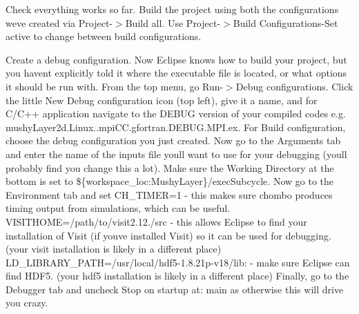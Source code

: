 \begin{DoxyEnumerate}
\item Check everything works so far. Build the project using both the configurations we\textquotesingle{}ve created via Project-\/$>$Build all. Use Project-\/$>$Build Configurations-\/\+Set active to change between build configurations.
\item Create a debug configuration. Now Eclipse knows how to build your project, but you haven\textquotesingle{}t explicitly told it where the executable file is located, or what options it should be run with. From the top menu, go Run-\/$>$Debug configurations. Click the little \textquotesingle{}New Debug configuration\textquotesingle{} icon (top left), give it a name, and for C/\+C++ application navigate to the D\+E\+B\+UG version of your compiled codes e.\+g. {\ttfamily mushy\+Layer2d.\+Linux..\+mpi\+C\+C.\+gfortran.\+D\+E\+B\+U\+G.\+M\+P\+I.\+ex}. For Build configuration, choose the debug configuration you just created. Now go to the Arguments tab and enter the name of the inputs file you\textquotesingle{}ll want to use for your debugging (you\textquotesingle{}ll probably find you change this a lot). Make sure the Working Directory at the bottom is set to {\ttfamily \$\{workspace\+\_\+loc\+:Mushy\+Layer\}/exec\+Subcycle}. Now go to the Environment tab and set {\ttfamily C\+H\+\_\+\+T\+I\+M\+ER=1} -\/ this makes sure chombo produces timing output from simulations, which can be useful. {\ttfamily V\+I\+S\+I\+T\+H\+O\+ME=/path/to/visit2.12./src} -\/ this allows Eclipse to find your installation of Visit (if you\textquotesingle{}ve installed Visit) so it can be used for debugging. (your visit installation is likely in a different place) {\ttfamily L\+D\+\_\+\+L\+I\+B\+R\+A\+R\+Y\+\_\+\+P\+A\+TH=/usr/local/hdf5-\/1.8.\+21p-\/v18/lib\+:} -\/ make sure Eclipse can find H\+D\+F5. (your hdf5 installation is likely in a different place) Finally, go to the Debugger tab and uncheck \textquotesingle{}Stop on startup at\+: main\textquotesingle{} as otherwise this will drive you crazy.
\end{DoxyEnumerate}

